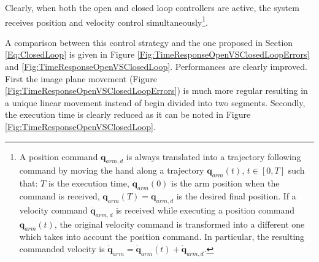 Clearly, when both the open and closed loop controllers are active, the system receives position 
and velocity control simultaneously\footnote{A position command ${\mathbf q}_{arm,d}$ is 
always translated into a trajectory following command by moving 
the hand along a trajectory $\mathbf q_{arm}(t)$, $t \in [0, T]$ such that: $T$ is the execution time,
$\mathbf q_{arm}(0)$ is the arm position when the command is received, $\mathbf q_{arm}(T) = {\mathbf q}_{arm,d}$ is the desired final position. If a velocity command $\dot {\mathbf q}_{arm,d}$ is received while executing a position
command $\mathbf q_{arm}(t)$, the original velocity command is transformed into a different
one which takes into account the position command. In particular, the resulting commanded 
velocity is $\dot {\mathbf q}_{arm} = \dot {\mathbf q}_{arm}(t) + \dot {\mathbf q}_{arm, d}$.}. 

A comparison between this control strategy and the one proposed in Section \ref{Eq:ClosedLoop}
is given in Figure \ref{Fig:TimeResponseOpenVSClosedLoopErrors} and \ref{Fig:TimeResponseOpenVSClosedLoop}. 
Performances are clearly improved. First the image plane movement (Figure \ref{Fig:TimeResponseOpenVSClosedLoopErrors})
is much more regular resulting in a unique linear movement instead of begin divided into two segments. Secondly, the
execution time is clearly reduced as it can be noted in Figure \ref{Fig:TimeResponseOpenVSClosedLoop}.


